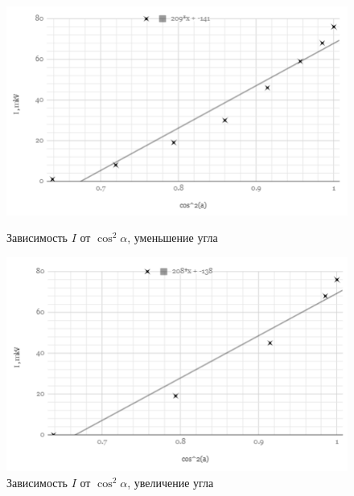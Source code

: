 \documentclass[a4paper]{article}
\begin{document}
\begin{enumerate}
\begin{figure}[h]
\begin{center}
\begin{minipage}[h]{0.45\linewidth}
\includegraphics[width=1\linewidth]{mal1.PNG}
\caption{Зависимость $I$ от $\cos^2 \alpha$, уменьшение угла} %
\label{ris:experimoriginal} %
\end{minipage}
\hfill 
\begin{minipage}[h]{0.45\linewidth}
\includegraphics[width=1\linewidth]{mal2.PNG}
\caption{Зависимость $I$ от $\cos^2 \alpha$, увеличение угла}
\label{ris:experimcoded}
\end{minipage}
\end{center}
\end{figure}
\end{enumerate}
\end{document}

